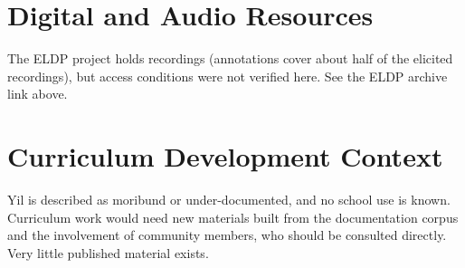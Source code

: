 \documentclass[12pt]{article}
\begin{document}
\section{Digital and Audio Resources}
The ELDP project holds recordings (annotations cover about half of the elicited recordings), but access conditions were not verified here. See the ELDP archive link above.

\section{Curriculum Development Context}
Yil is described as moribund or under-documented, and no school use is known. Curriculum work would need new materials built from the documentation corpus and the involvement of community members, who should be consulted directly. Very little published material exists.
\end{document}
